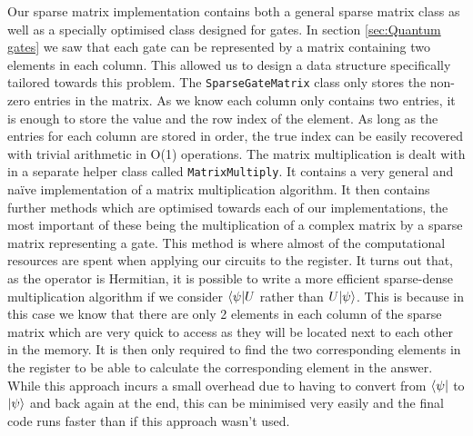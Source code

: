 \documentclass[bibliography=totocnumbered, 10pt]{article}
\theoremstyle{NoticeStyle}
\begin{document}
Our sparse matrix implementation contains both a general sparse matrix class as well as a specially optimised class designed for gates. In section \ref{sec:Quantum gates} we saw that each gate can be represented by a matrix containing two elements in each column. This allowed us to design a data structure specifically tailored towards this problem.
The \texttt{SparseGateMatrix} class only stores the non-zero entries in the matrix. As we know each column only contains two entries, it is enough to store the value and the row index of the element. As long as the entries for each column are stored in order, the true index can be easily recovered with trivial arithmetic in O(1) operations.
The matrix multiplication is dealt with in a separate helper class called \texttt{MatrixMultiply}. It contains a very general and naïve implementation of a matrix multiplication algorithm. It then contains further methods which are optimised towards each of our implementations, the most important of these being the multiplication of a complex matrix by a sparse matrix representing a gate. This method is where almost of the computational resources are spent when applying our circuits to the register. It turns out that, as the operator is Hermitian, it is possible to write a more efficient sparse-dense multiplication algorithm if we consider ${\left\langle{\psi}\right\vert} U$ rather than $U {\left\vert{\psi}\right\rangle}$. This is because in this case we know that there are only 2 elements in each column of the sparse matrix which are very quick to access as they will be located next to each other in the memory. It is then only required to find the two corresponding elements in the register to be able to calculate the corresponding element in the answer. While this approach incurs a small overhead due to having to convert from ${\left\langle{\psi}\right\vert}$ to ${\left\vert{\psi}\right\rangle}$ and back again at the end, this can be minimised very easily and the final code runs faster than if this approach wasn’t used.
\end{document}
